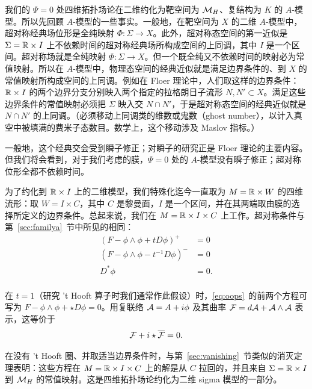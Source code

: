 我们的 $\Psi=0$ 处四维拓扑场论在二维约化为靶空间为 $\MH$、复结构为 $K$ 的 $A$-模型。所以先回顾 $A$-模型的一些事实。一般地，在靶空间为 $X$ 的二维 $A$-模型中，超对称经典场位形是全纯映射 $\Phi:\Sigma\to X$。此外，超对称态空间的第一近似是 $\Sigma=\Bbb{R}\times I$ 上不依赖时间的超对称经典场所构成空间的上同调，其中 $I$ 是一个区间。超对称场就是全纯映射 $\Phi:\Sigma\to X$。但一个既全纯又不依赖时间的映射必为常值映射。所以在 $A$-模型中，物理态空间的经典近似就是满足边界条件的、到 $X$ 的常值映射所构成空间的上同调。例如在 Floer 理论中，人们取这样的边界条件：$\Bbb{R}\times I$ 的两个边界分支分别映入两个指定的拉格朗日子流形 $N,N'\subset X$。满足这些边界条件的常值映射必须把 $\Sigma$ 映入交 $N\cap N'$，于是超对称态空间的经典近似就是 $N\cap N'$ 的上同调。（必须移动上同调类的维数或鬼数（ghost number），以计入真空中被填满的费米子态数目。数学上，这个移动涉及 Maslov 指标。）

一般地，这个经典交会受到瞬子修正；对瞬子的研究正是 Floer 理论的主要内容。但我们将会看到，对于我们考虑的膜，$\Psi=0$ 处的 $A$-模型没有瞬子修正；超对称位形全都不依赖时间。

\par{}

为了约化到 $\Bbb{R}\times I$ 上的二维模型，我们特殊化迄今一直取为 $M=\Bbb{R}\times W$ 的四维流形：取 $W=I\times C$，其中 $C$ 是黎曼面，$I$ 是一个区间，并在其两端取由膜的选择所定义的边界条件。总起来说，我们在 $M=\Bbb{R}\times I\times C$ 上工作。超对称条件与第~\ref{sec:familya}~节中所见的相同：
\setcounter{equation}{0}
\begin{equation}\label{eq:oops}
\begin{aligned}(F-\phi\wedge\phi+tD\phi)^+ & = 0 \\
                      (F-\phi\wedge\phi-t^{-1}D\phi)^-& = 0 \\
                      D^* \phi & = 0.\\\end{aligned}
\end{equation}

在 $t=1$（研究 't Hooft 算子时我们通常作此假设）时，\eqref{eq:oops}\ 的前两个方程可写为 $F-\phi\wedge \phi+\star D\phi=0$。用复联络 $\CA=A+i\phi$ 及其曲率 $\CF=d\CA+\CA\wedge\CA$ 表示，这等价于 %
\setcounter{equation}{1}
\begin{equation}\label{eq:nops}
{\cal F}+i\star\bar\CF=0.
\end{equation}

在没有 't Hooft 圈、并取适当边界条件时，与第~\ref{sec:vanishing}~节类似的消灭定理表明：这些方程在 $M=\Bbb{R}\times I\times C$ 上的解是从 $C$ 拉回的，并且来自 $\Sigma=\Bbb{R}\times I$ 到 $\MH$ 的常值映射。这是四维拓扑场论约化为二维 sigma 模型的一部分。

